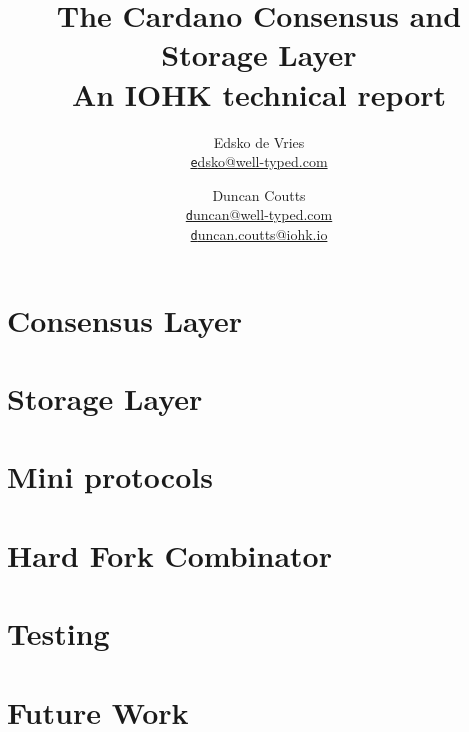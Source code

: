 \documentclass[11pt,a4paper]{report}
\title{The Cardano Consensus and Storage Layer \\
       {\large \sc An IOHK technical report}
  }
\author{Edsko de Vries \\ \href{mailto:edsko@well-typed.com}
                               {\small \texttt edsko@well-typed.com}
   \and Duncan Coutts  \\ \href{mailto:duncan@well-typed.com}
                               {\small \texttt duncan@well-typed.com}
                       \\ \href{mailto:duncan.coutts@iohk.io}
                               {\small \texttt duncan.coutts@iohk.io}
  }
\theoremstyle{definition}
\numberwithin{property}{chapter}
\numberwithin{definition}{chapter}
\numberwithin{lemma}{chapter}
\numberwithin{assumption}{chapter}
\numberwithin{corollary}{chapter}
\begin{document}
\maketitle

\tableofcontents





\part{Consensus Layer}





\part{Storage Layer}









\part{Mini protocols}




\part{Hard Fork Combinator}





\part{Testing}




\part{Future Work}
\end{document}
